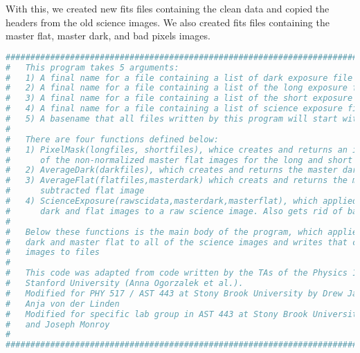 \documentclass{aastex}
\begin{document}
With this, we created new fits files containing the clean data and copied the headers from the old science images. We also created fits files containing the master flat, master dark, and bad pixels images.
\begin{lstlisting}[language=Python, caption= Cleans science images (YM)]
##########################################################################################
#   This program takes 5 arguments:                                                      #
#   1) A final name for a file containing a list of dark exposure file names             #
#   2) A final name for a file containing a list of the long exposure flats file names   #
#   3) A final name for a file containing a list of the short exposure flats file names  #
#   4) A final name for a file containing a list of science exposure file names          #
#   5) A basename that all files written by this program will start with                 #
#                                                                                        #
#   There are four functions defined below:                                              #
#   1) PixelMask(longfiles, shortfiles), whice creates and returns an image of the ratio #
#      of the non-normalized master flat images for the long and short exposures         #
#   2) AverageDark(darkfiles), which creates and returns the master dark image           #
#   3) AverageFlat(flatfiles,masterdark) which creats and returns the master dark        #
#      subtracted flat image                                                             #
#   4) ScienceExposure(rawscidata,masterdark,masterflat), which applied the master       #
#      dark and flat images to a raw science image. Also gets rid of bad pixels          #
#                                                                                        #
#   Below these functions is the main body of the program, which applies the master      #
#   dark and master flat to all of the science images and writes that clean science      #
#   images to files                                                                      #
#                                                                                        #
#   This code was adapted from code written by the TAs of the Physics 100 course at      #
#   Stanford University (Anna Ogorzalek et al.).                                         #
#   Modified for PHY 517 / AST 443 at Stony Brook University by Drew Jamieson and        #
#   Anja von der Linden                                                                  #
#   Modified for specific lab group in AST 443 at Stony Brook University by Yogesh Mehta # 
#   and Joseph Monroy                                                                    #
#                                                                                        #
##########################################################################################


\end{lstlisting}
\end{document}
